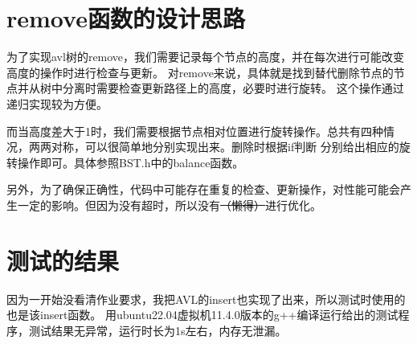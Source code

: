 \documentclass[UTF8]{ctexart}
\begin{document}
\pagestyle{fancy}
\fancyhead{}

\section{remove函数的设计思路}

\par 为了实现avl树的remove，我们需要记录每个节点的高度，并在每次进行可能改变高度的操作时进行检查与更新。
对remove来说，具体就是找到替代删除节点的节点并从树中分离时需要检查更新路径上的高度，必要时进行旋转。
这个操作通过递归实现较为方便。

\par 而当高度差大于1时，我们需要根据节点相对位置进行旋转操作。总共有四种情况，两两对称，可以很简单地分别实现出来。删除时根据if判断
分别给出相应的旋转操作即可。具体参照BST.h中的balance函数。

\par 另外，为了确保正确性，代码中可能存在重复的检查、更新操作，对性能可能会产生一定的影响。但因为没有超时，所以没有\sout{（懒得）}进行优化。

\section{测试的结果}

\par 因为一开始没看清作业要求，我把AVL的insert也实现了出来，所以测试时使用的也是该insert函数。
用ubuntu22.04虚拟机11.4.0版本的g++编译运行给出的测试程序，测试结果无异常，运行时长为1s左右，内存无泄漏。
\end{document}
